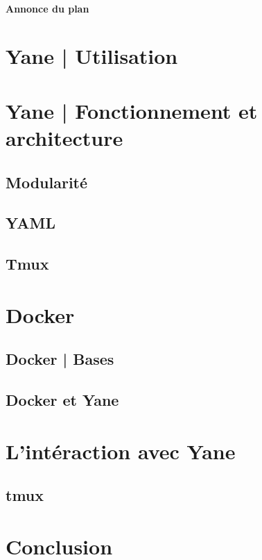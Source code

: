 \documentclass{article}
\begin{document}
	\paragraph{Annonce du plan}

	\newpage	



	\section{Yane | Utilisation}
		\subsection{}
		\subsection{}
		\subsection{}
		\newpage
	\section{Yane | Fonctionnement et architecture}
		\subsection{Modularité}
		\subsection{YAML}
		\subsection{Tmux}
		\newpage
	\section{Docker}
		\subsection{Docker | Bases}
		\subsection{Docker et Yane}
		\subsection{}
		\newpage
	\section{L'intéraction avec Yane}
		\subsection{tmux}
		\newpage
	\section{Conclusion}
\end{document}
